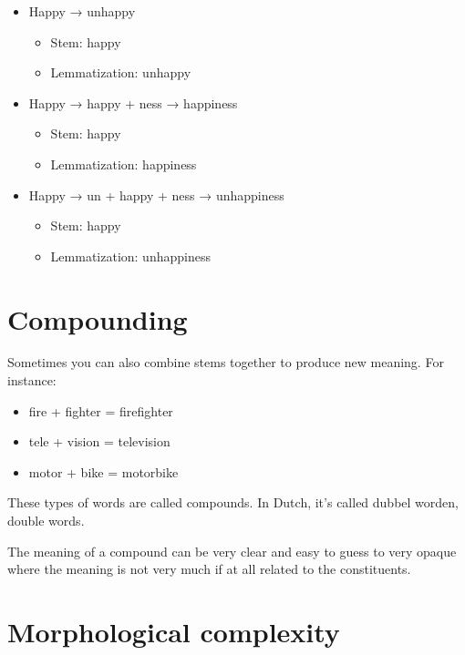\documentclass[
  11pt,
  british,
]{article}
\providecommand{\tightlist}{%
  \setlength{\itemsep}{0pt}\setlength{\parskip}{0pt}}
\begin{document}
\begin{itemize}
\tightlist
\item
  Happy → unhappy

  \begin{itemize}
  \tightlist
  \item
    Stem: happy
  \item
    Lemmatization: unhappy
  \end{itemize}
\item
  Happy → happy + ness → happiness

  \begin{itemize}
  \tightlist
  \item
    Stem: happy
  \item
    Lemmatization: happiness
  \end{itemize}
\item
  Happy → un + happy + ness → unhappiness

  \begin{itemize}
  \tightlist
  \item
    Stem: happy
  \item
    Lemmatization: unhappiness
  \end{itemize}
\end{itemize}

\hypertarget{compounding}{%
\section{Compounding}\label{compounding}}

Sometimes you can also combine stems together to produce new meaning.
For instance:

\begin{itemize}
\tightlist
\item
  fire + fighter = firefighter
\item
  tele + vision = television
\item
  motor + bike = motorbike
\end{itemize}

These types of words are called compounds. In Dutch, it's called dubbel
worden, double words.

The meaning of a compound can be very clear and easy to guess to very
opaque where the meaning is not very much if at all related to the
constituents.

\hypertarget{morphological-complexity}{%
\section{Morphological complexity}\label{morphological-complexity}}
\end{document}
